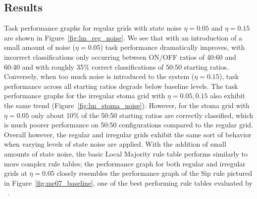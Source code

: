 \documentclass[a4paper,11pt]{report}
\begin{document}
\subsection*{Results}

Task performance graphs for regular grids with state noise $\eta=0.05$ and $\eta=0.15$ are shown in Figure~\ref{fig:lm_reg_noise}. We see that with an introduction of a small amount of noise ($\eta=0.05$) task performance dramatically improves, with incorrect classifications only occurring between ON/OFF ratios of 40:60 and 60:40 and with roughly 35\% correct classifications of 50:50 starting ratios. Conversely, when too much noise is introduced to the system ($\eta=0.15$), task performance across all starting ratios degrade below baseline levels. The task performance graphs for the irregular stoma grid with $\eta=0.05, 0.15$ also exhibit the same trend (Figure~\ref{fig:lm_stoma_noise}). However, for the stoma grid with $\eta=0.05$ only about 10\% of the 50:50 starting ratios are correctly classified, which is much poorer performance on 50:50 configurations compared to the regular grid. Overall however, the regular and irregular grids exhibit the same sort of behavior when varying levels of state noise are applied. With the addition of small amounts of state noise, the basic Local Majority rule table performs similarly to more complex rule tables; the performance graph for both regular and irregular grids at $\eta=0.05$ closely resembles the performance graph of the Sip rule pictured in Figure~\ref{fig:me07_baseline}, one of the best performing rule tables evaluated by \citeauthor{me07}~\cite{me07}.
\end{document}
